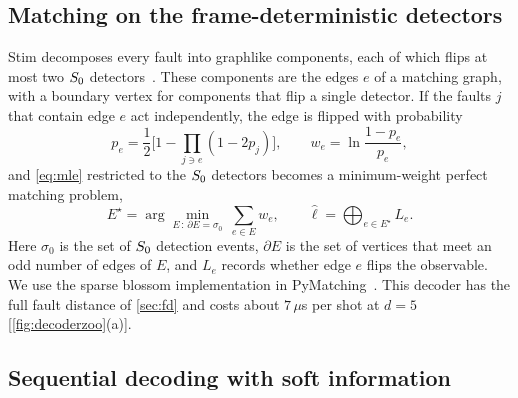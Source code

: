 \subsection{Matching on the frame-deterministic detectors}

Stim decomposes every fault into graphlike components, each of which flips at most two $S_0$ detectors~\cite{gidney2021stim}. These components are the edges $e$ of a matching graph, with a boundary vertex for components that flip a single detector. If the faults $j$ that contain edge $e$ act independently, the edge is flipped with probability
\begin{equation}
  p_e=\frac12\Big[1-\prod_{j\ni e}\left(1-2p_j\right)\Big],\qquad w_e=\ln\frac{1-p_e}{p_e},
  \label{eq:weights}
\end{equation}
and \autoref{eq:mle} restricted to the $S_0$ detectors becomes a minimum-weight perfect matching problem,
\begin{equation}
  E^\star=\arg\min_{E\,:\,\partial E=\sigma_0}\ \sum_{e\in E}w_e,\qquad \hat\ell=\bigoplus_{e\in E^\star}L_e .
  \label{eq:mwpm}
\end{equation}
Here $\sigma_0$ is the set of $S_0$ detection events, $\partial E$ is the set of vertices that meet an odd number of edges of $E$, and $L_e$ records whether edge $e$ flips the observable. We use the sparse blossom implementation in PyMatching~\cite{higgott2025sparse,higgott2022pymatching}. This decoder has the full fault distance of \autoref{sec:fd} and costs about $7\,\mu$s per shot at $d=5$ [\autoref{fig:decoderzoo}(a)].

\subsection{Sequential decoding with soft information}
\label{sec:seqbp}

